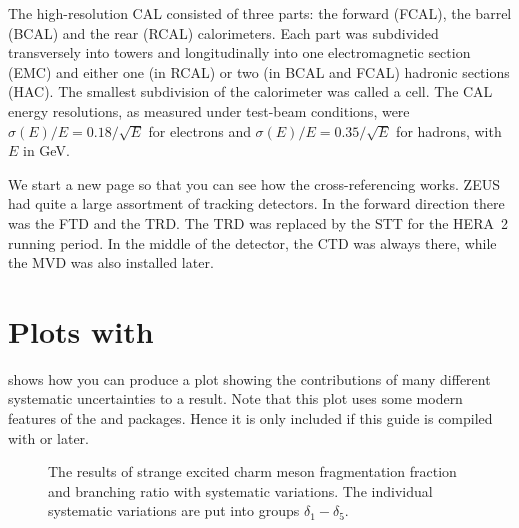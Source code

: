The high-resolution \gls{CAL} consisted of three parts: the forward
(FCAL), the barrel (BCAL) and the rear (RCAL) calorimeters. Each part
was subdivided transversely into towers and longitudinally into one
electromagnetic section (EMC) and either one (in RCAL) or two (in BCAL
and FCAL) hadronic sections (HAC). The smallest subdivision of the
calorimeter was called a cell.  The \gls{CAL} energy resolutions, as
measured under test-beam conditions, were $\sigma(E)/E=0.18/\sqrt{E}$
for electrons and $\sigma(E)/E=0.35/\sqrt{E}$ for hadrons, with $E$ in
\si{\GeV}.  \clearpage

We start a new page so that you can see how the cross-referencing
works.  ZEUS had quite a large assortment of tracking detectors. In the
forward direction there was the \gls{FTD} and the \gls{TRD}. The
\gls{TRD} was replaced by the \gls{STT} for the HERA~2 running
period.  In the middle of the detector, the \gls{CTD} was always
there, while the \gls{MVD} was also installed later.


\chapter{Plots with \Package{\TikZ}}%
\label{sec:app:tikz}

 shows how you can produce a plot showing
the contributions of many different systematic uncertainties to a
result. Note that this plot uses some modern features of
the  and  packages. Hence it is only included if
this guide is compiled with  or later.


\begin{figure}[htbp]
  \centering
  
  \caption[Strange $D^{**}$ systematics, fragmentation fractions]{The
    results of strange excited charm meson fragmentation fraction and
    branching ratio with systematic variations.  The individual
    systematic variations are put into groups $\delta_1-\delta_5$.}%
  \label{fig:tikz:syst}
\end{figure}


